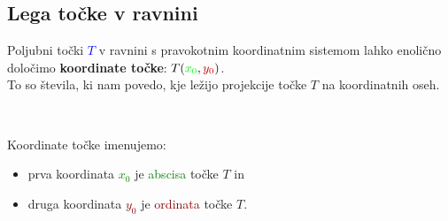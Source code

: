         \subsection*{Lega točke v ravnini}
        


            Poljubni točki \textcolor{blue}{$T$} v ravnini s pravokotnim koordinatnim sistemom lahko enolično določimo \textbf{koordinate točke}: \textcolor{blue}{$T(\textcolor{green}{x_0},\textcolor{darkred}{y_0})$}. \\
            To so števila, ki nam povedo, kje ležijo projekcije točke $T$ na koordinatnih oseh.

            ~

            Koordinate točke imenujemo:
                \begin{itemize}
                    \item prva koordinata \textcolor{green}{$x_0$} je \textcolor{green}{abscisa} točke $T$ in
                    \item druga koordinata \textcolor{darkred}{$y_0$} je \textcolor{darkred}{ordinata} točke $T$.
                \end{itemize}

            
                        
